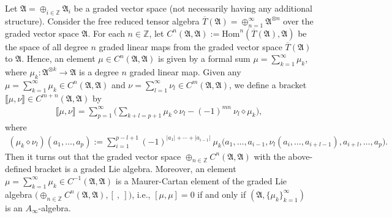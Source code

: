 \documentclass[a4paper,reqno,10pt]{amsart}
\theoremstyle{plain}
\theoremstyle{definition}
\theoremstyle{remark}
\begin{document}
Let $\mathfrak{A} = \oplus_{i \in \mathbb{Z}} \mathfrak{A}_i$ be a graded vector space (not necessarily having any additional structure). Consider the free reduced tensor algebra $\overline{T} (\mathfrak{A}) = \oplus_{n=1}^\infty \mathfrak{A}^{\otimes n}$ over the graded vector space $\mathfrak{A}$. For each $n \in \mathbb{Z}$, let $C^n (\mathfrak{A}, \mathfrak{A}) := \mathrm{Hom}^n ( \overline{T} (\mathfrak{A}), \mathfrak{A})$ be the space of all degree $n$ graded linear maps from the graded vector space $\overline{T} (\mathfrak{A})$ to $\mathfrak{A}$. Hence, an element $\mu \in C^n (\mathfrak{A}, \mathfrak{A})$ is given by a formal sum $\mu = \sum_{k=1}^\infty \mu_k$, where $\mu_k : \mathfrak{A}^{\otimes k} \rightarrow \mathfrak{A}$ is a degree $n$ graded linear map. Given any $\mu = \sum_{k=1}^\infty \mu_k \in C^n (\mathfrak{A}, \mathfrak{A})$ and $\nu = \sum_{l=1}^\infty \nu_l \in C^m (\mathfrak{A}, \mathfrak{A})$, we define a bracket $\llbracket \mu, \nu \rrbracket \in C^{m+n} (\mathfrak{A}, \mathfrak{A})$ by
\begin{align*}
    \llbracket \mu, \nu \rrbracket = \sum_{p =1}^\infty \big(  \sum_{k+l = p+1} \mu_k \diamond \nu_l - (-1)^{mn} ~ \! \nu_l \diamond \mu_k    \big),
\end{align*}
where
\begin{align*}
    (\mu_k \diamond \nu_l) (a_1, \ldots, a_p) := \sum_{i=1}^{p-l+1} (-1)^{|a_1| + \cdots + |a_{i-1}|} ~\! \mu_k \big( a_1, \ldots, a_{i-1}, \nu_l (a_i, \ldots, a_{i+l-1}), a_{i+l}, \ldots, a_p \big).
\end{align*}
Then it turns out that the graded vector space $\oplus_{n \in \mathbb{Z}} C^n (\mathfrak{A}, \mathfrak{A})$ with the above-defined bracket is a graded Lie algebra. Moreover, an element $\mu = \sum_{k=1}^\infty \mu_k \in C^{-1} (\mathfrak{A}, \mathfrak{A})$ is a Maurer-Cartan element of the graded Lie algebra $\big(   \oplus_{n \in \mathbb{Z}} C^n (\mathfrak{A}, \mathfrak{A}), [~, ~]  \big)$, i.e., $[\mu, \mu] = 0$ if and only if $(\mathfrak{A}, \{ \mu_k \}_{k=1}^\infty)$ is an $A_\infty$-algebra.

\medskip
\end{document}
